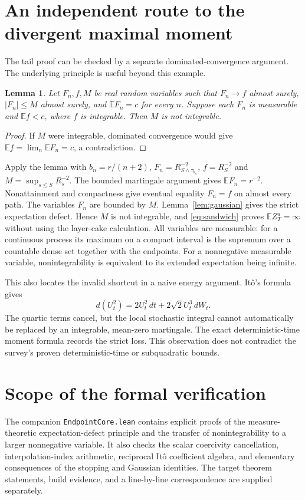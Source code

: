 \documentclass[11pt]{article}
\newtheorem{lemma}[theorem]{Lemma}
\theoremstyle{remark}\newtheorem{remark}[theorem]{Remark}
\newcommand{\E}{\mathbb E}\newcommand{\Pp}{\mathbb P}
\begin{document}
\section{An independent route to the divergent maximal moment}
The tail proof can be checked by a separate dominated-convergence argument. The underlying principle is useful beyond this example.

\begin{lemma}\label{lem:defect}
Let $F_n,f,M$ be real random variables such that $F_n\to f$ almost surely, $|F_n|\le M$ almost surely, and $\E F_n=c$ for every $n$. Suppose each $F_n$ is measurable and $\E f<c$, where $f$ is integrable. Then $M$ is not integrable.
\end{lemma}
\begin{proof}
If $M$ were integrable, dominated convergence would give $\E f=\lim_n\E F_n=c$, a contradiction.
\end{proof}

Apply the lemma with $b_n=r/(n+2)$, $F_n=R_{S\wedge\tau_{b_n}}^{-2}$, $f=R_S^{-2}$ and $M=\sup_{s\le S}R_s^{-2}$. The bounded martingale argument gives $\E F_n=r^{-2}$. Nonattainment and compactness give eventual equality $F_n=f$ on almost every path. The variables $F_n$ are bounded by $M$. Lemma~\ref{lem:gaussian} gives the strict expectation defect. Hence $M$ is not integrable, and \eqref{eq:sandwich} proves $\E Z_T^a=\infty$ without using the layer-cake calculation. All variables are measurable: for a continuous process its maximum on a compact interval is the supremum over a countable dense set together with the endpoints. For a nonnegative measurable variable, nonintegrability is equivalent to its extended expectation being infinite.

This also locates the invalid shortcut in a naive energy argument. It\^o's formula gives
\[
 d(U_t^2)=2U_t^2\,dt+2\sqrt2 U_t^3\,dW_t.
\]
The quartic terms cancel, but the local stochastic integral cannot automatically be replaced by an integrable, mean-zero martingale. The exact deterministic-time moment formula records the strict loss. This observation does not contradict the survey's proven deterministic-time or subquadratic bounds.

\section{Scope of the formal verification}
The companion \texttt{EndpointCore.lean} contains explicit proofs of the measure-theoretic expectation-defect principle and the transfer of nonintegrability to a larger nonnegative variable. It also checks the scalar coercivity cancellation, interpolation-index arithmetic, reciprocal It\^o coefficient algebra, and elementary consequences of the stopping and Gaussian identities. The target theorem statements, build evidence, and a line-by-line correspondence are supplied separately.
\end{document}
